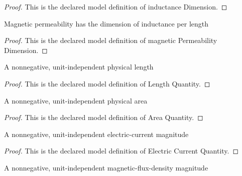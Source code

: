 \begin{proof}
  This is the declared model definition of inductance Dimension.
\end{proof}
\begin{definition}
  \label{def:physics:phyx-mini-0939:phyxminiproblems-problemphyxmini0939-magneticpermeabilitydimension}
  Magnetic permeability has the dimension of inductance per length
\end{definition}
\begin{proof}
  This is the declared model definition of magnetic Permeability Dimension.
\end{proof}
\begin{definition}
  \label{def:physics:phyx-mini-0939:phyxminiproblems-problemphyxmini0939-lengthquantity}
  A nonnegative, unit-independent physical length
\end{definition}
\begin{proof}
  This is the declared model definition of Length Quantity.
\end{proof}
\begin{definition}
  \label{def:physics:phyx-mini-0939:phyxminiproblems-problemphyxmini0939-areaquantity}
  A nonnegative, unit-independent physical area
\end{definition}
\begin{proof}
  This is the declared model definition of Area Quantity.
\end{proof}
\begin{definition}
  \label{def:physics:phyx-mini-0939:phyxminiproblems-problemphyxmini0939-electriccurrentquantity}
  A nonnegative, unit-independent electric-current magnitude
\end{definition}
\begin{proof}
  This is the declared model definition of Electric Current Quantity.
\end{proof}
\begin{definition}
  \label{def:physics:phyx-mini-0939:phyxminiproblems-problemphyxmini0939-magneticfluxdensityquantity}
  A nonnegative, unit-independent magnetic-flux-density magnitude
\end{definition}
